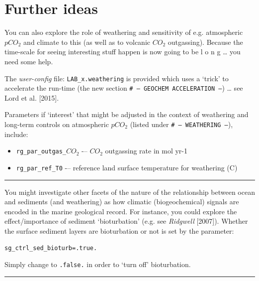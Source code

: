 \documentclass[11pt,fleqn]{book} %
\begin{document}

\newpage


\section{Further ideas}

You can also explore the role of weathering and sensitivity of e.g. atmospheric \(pCO_{2}\) and climate to this (as well as to volcanic \(CO_{2}\) outgassing). Because the time-scale for seeing interesting stuff happen is now going to be l o n g … you need some help.

The \textit{user-config} file: \texttt{LAB\_x.weathering} is provided which uses a ‘trick’ to accelerate the run-time (the new section \texttt{\# --- GEOCHEM ACCELERATION ---}) … see Lord et al. [2015]. 

Parameters if ‘interest’ that might be adjusted in the context of weathering and long-term controls on atmospheric \(pCO_{2}\) (listed under \texttt{\# --- WEATHERING ---}), include:

\begin{itemize}[noitemsep]
\item \texttt{rg\_par\_outgas\_\(CO_{2}\)} -– \(CO_{2}\) outgassing rate in mol yr-1
\item \texttt{rg\_par\_ref\_T0} -– reference land surface temperature for weathering (C)
\end{itemize}

\vspace{1mm}
\noindent\rule{4cm}{0.1mm}
\vspace{2mm}

\noindent You might investigate other facets of the nature of the relationship between ocean and sediments (and weathering) as how climatic (biogeochemical) signals are encoded in the marine geological record. For instance, you could explore the effect/importance of sediment ‘bioturbation’ (e.g. see \textit{Ridgwell} [2007]). Whether the surface sediment layers are bioturbation or not is set by the parameter:
\begin{verbatim}
sg_ctrl_sed_bioturb=.true.
\end{verbatim}
Simply change to \texttt{.false.} in order to ‘turn off’ bioturbation.

\vspace{1mm}
\noindent\rule{4cm}{0.1mm}
\vspace{2mm}
\end{document}

